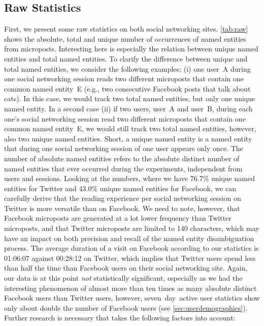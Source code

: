 \documentclass{iosart2c}
\begin{document}
\subsection{Raw Statistics}
First, we present some raw statistics on both social networking sites.
\autoref{tab:raw} shows the absolute, total and unique number of occurrences of named entities from microposts.
Interesting here is especially the relation between unique named entities and total named entities.
To clarify the difference between unique and total named entities, we consider the following examples:
(i) one user~A during one social networking session reads two different microposts that contain one common named entity~E (e.g., two consecutive Facebook posts that talk about cats).
In this case, we would track two total named entities, but only one unique named entity.
In a second case (ii) if two users, user~A and user~B, during each one's social networking session read two different microposts that contain one common named entity~E, we would still track two total named entities, however, also two unique named entities.
Short, a unique named entity is a named entity that during one social networking session of one user appears only once.
The number of absolute named entities refers to the absolute distinct number of named entities that ever occurred during the experiments, independent from users and sessions.
Looking at the numbers, where we have 76.7\% unique named entities for Twitter and 43.0\% unique named entities for Facebook, we can carefully derive that the reading experience per social networking session on Twitter is more versatile than on Facebook.
We need to note, however, that Facebook microposts are generated at a lot lower frequency than Twitter microposts, and that Twitter microposts are limited to 140 characters, which may have an impact on both precision and recall of the named entity disambiguation process.
The average duration of a visit on Facebook according to our statistics is 01:06:07 against 00:28:12 on Twitter, which implies that Twitter users spend less than half the time than Facebook users on their social networking site.
Again, our data is at this point \emph{not} statistically significant, especially as we had the interesting phenomenon of almost more than ten times as many absolute distinct Facebook users than Twitter users, however, seven~day~active user statistics show only about double the number of Facebook users (see \autoref{sec:userdemographics}).
Further research is necessary that takes the following factors into account:
\end{document}
